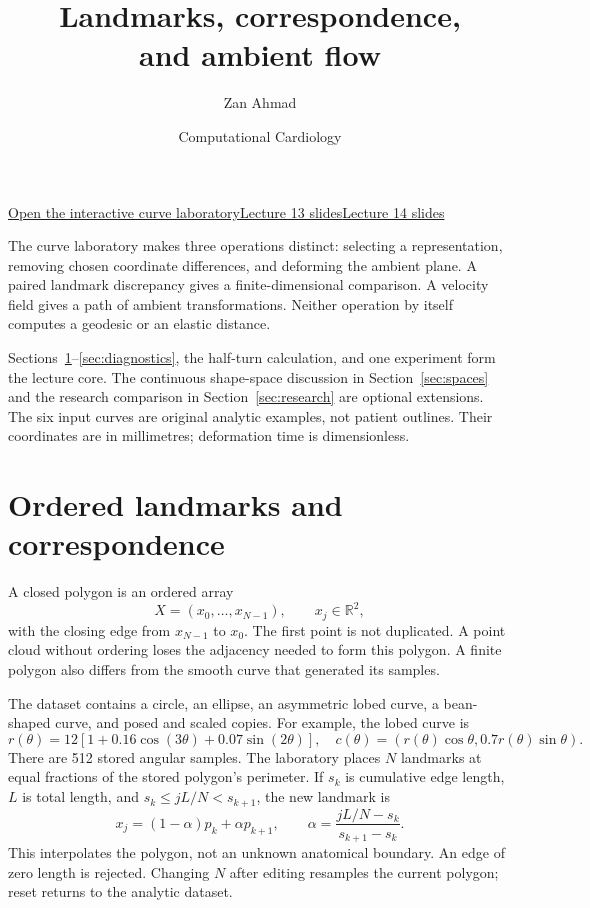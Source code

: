 \documentclass[11pt]{article}
\title{Landmarks, correspondence,\protect\\ and ambient flow}\author{Zan Ahmad}\date{Computational Cardiology}
\newcommand{\R}{\mathbb R}\newcommand{\dd}{\,\mathrm d}\newcommand{\rms}{d_{\mathrm{RMS}}}
\begin{document}
\maketitle
\noindent\href{index.html}{Open the interactive curve laboratory}\quad\href{../../m13/slides.html}{Lecture 13 slides}\quad\href{../../m14/slides.html}{Lecture 14 slides}

The curve laboratory makes three operations distinct: selecting a representation, removing chosen coordinate differences, and deforming the ambient plane. A paired landmark discrepancy gives a finite-dimensional comparison. A velocity field gives a path of ambient transformations. Neither operation by itself computes a geodesic or an elastic distance.

Sections~\ref{sec:arrays}--\ref{sec:diagnostics}, the half-turn calculation, and one experiment form the lecture core. The continuous shape-space discussion in Section~\ref{sec:spaces} and the research comparison in Section~\ref{sec:research} are optional extensions. The six input curves are original analytic examples, not patient outlines. Their coordinates are in millimetres; deformation time is dimensionless.

\section{Ordered landmarks and correspondence}\label{sec:arrays}
A closed polygon is an ordered array
\[
 X=(x_0,\ldots,x_{N-1}),\qquad x_j\in\R^2,
\]
with the closing edge from $x_{N-1}$ to $x_0$. The first point is not duplicated. A point cloud without ordering loses the adjacency needed to form this polygon. A finite polygon also differs from the smooth curve that generated its samples.

The dataset contains a circle, an ellipse, an asymmetric lobed curve, a bean-shaped curve, and posed and scaled copies. For example, the lobed curve is
\[
 r(\theta)=12[1+0.16\cos(3\theta)+0.07\sin(2\theta)],\quad
 c(\theta)=(r(\theta)\cos\theta,0.7r(\theta)\sin\theta).
\]
There are 512 stored angular samples. The laboratory places $N$ landmarks at equal fractions of the stored polygon's perimeter. If $s_k$ is cumulative edge length, $L$ is total length, and $s_k\le jL/N<s_{k+1}$, the new landmark is
\[
 x_j=(1-\alpha)p_k+\alpha p_{k+1},\qquad
 \alpha=\frac{jL/N-s_k}{s_{k+1}-s_k}.
\]
This interpolates the polygon, not an unknown anatomical boundary. An edge of zero length is rejected. Changing $N$ after editing resamples the current polygon; reset returns to the analytic dataset.
\end{document}
